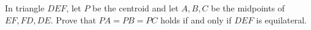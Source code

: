 In triangle $ DEF $, let $ P $ be the centroid and let $ A,B,C $ be the midpoints of $ EF,FD,DE $. Prove that $ PA=PB=PC $ holds if and only if $ DEF $ is equilateral.

